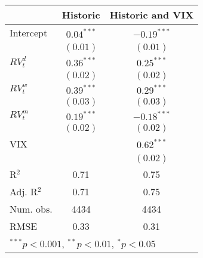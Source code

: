 
\begin{tabular}{l c c }
\hline
 & Historic & Historic and VIX \\
\hline
Intercept    & $0.04^{***}$ & $-0.19^{***}$ \\
             & $(0.01)$     & $(0.01)$      \\
$RV_{t}^{d}$ & $0.36^{***}$ & $0.25^{***}$  \\
             & $(0.02)$     & $(0.02)$      \\
$RV_{t}^{w}$ & $0.39^{***}$ & $0.29^{***}$  \\
             & $(0.03)$     & $(0.03)$      \\
$RV_{t}^{m}$ & $0.19^{***}$ & $-0.18^{***}$ \\
             & $(0.02)$     & $(0.02)$      \\
VIX          &              & $0.62^{***}$  \\
             &              & $(0.02)$      \\
\hline
R$^2$        & 0.71         & 0.75          \\
Adj. R$^2$   & 0.71         & 0.75          \\
Num. obs.    & 4434         & 4434          \\
RMSE         & 0.33         & 0.31          \\
\hline
\multicolumn{3}{l}{\scriptsize{$^{***}p<0.001$, $^{**}p<0.01$, $^*p<0.05$}}
\end{tabular}
